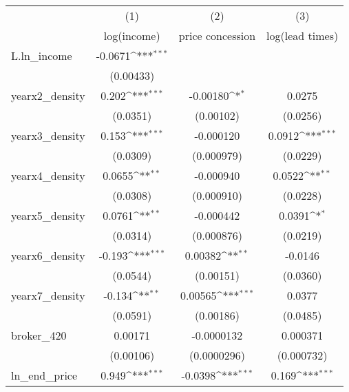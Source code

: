 {
\def\sym#1{\ifmmode^{#1}\else\(^{#1}\)\fi}
\begin{tabular}{l*{3}{c}}
\toprule
            &\multicolumn{1}{c}{(1)}&\multicolumn{1}{c}{(2)}&\multicolumn{1}{c}{(3)}\\
            &\multicolumn{1}{c}{log(income)}&\multicolumn{1}{c}{price concession}&\multicolumn{1}{c}{log(lead times)}\\
\midrule
L.ln\_income &     -0.0671\sym{***}&                     &                     \\
            &   (0.00433)         &                     &                     \\
\addlinespace
yearx2\_density&       0.202\sym{***}&    -0.00180\sym{*}  &      0.0275         \\
            &    (0.0351)         &   (0.00102)         &    (0.0256)         \\
\addlinespace
yearx3\_density&       0.153\sym{***}&   -0.000120         &      0.0912\sym{***}\\
            &    (0.0309)         &  (0.000979)         &    (0.0229)         \\
\addlinespace
yearx4\_density&      0.0655\sym{**} &   -0.000940         &      0.0522\sym{**} \\
            &    (0.0308)         &  (0.000910)         &    (0.0228)         \\
\addlinespace
yearx5\_density&      0.0761\sym{**} &   -0.000442         &      0.0391\sym{*}  \\
            &    (0.0314)         &  (0.000876)         &    (0.0219)         \\
\addlinespace
yearx6\_density&      -0.193\sym{***}&     0.00382\sym{**} &     -0.0146         \\
            &    (0.0544)         &   (0.00151)         &    (0.0360)         \\
\addlinespace
yearx7\_density&      -0.134\sym{**} &     0.00565\sym{***}&      0.0377         \\
            &    (0.0591)         &   (0.00186)         &    (0.0485)         \\
\addlinespace
broker\_420  &     0.00171         &  -0.0000132         &    0.000371         \\
            &   (0.00106)         & (0.0000296)         &  (0.000732)         \\
\addlinespace
ln\_end\_price&       0.949\sym{***}&     -0.0398\sym{***}&       0.169\sym{***}\\

\end{tabular}}
